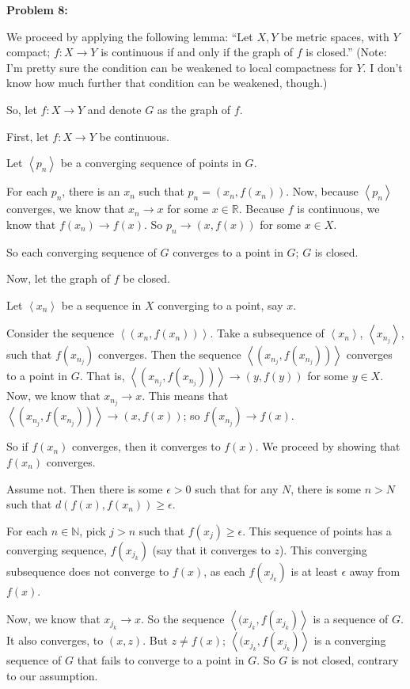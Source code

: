 \documentclass[a4paper,12pt]{article}
\newcommand{\tab}{\hspace{4mm}} %
\newcommand{\anbrack}[1]{\left\langle #1 \right\rangle}
\newcommand{\ep}{\epsilon}
\newcommand{\N}{\mathbb{N}}
\newcommand{\R}{\mathbb{R}}
\begin{document}
{\bf Problem 8:}

We proceed by applying the following lemma: ``Let $X, Y$ be metric spaces, with $Y$ compact; $f: X \to Y$ is continuous if and only if the graph of $f$ is closed.'' (Note: I'm pretty sure the condition can be weakened to local compactness for $Y$. I don't know how much further that condition can be weakened, though.)

So, let $f: X \to Y$ and denote $G$ as the graph of $f$.

First, let $f: X \to Y$ be continuous.

\tab Let $\anbrack{p_n}$ be a converging sequence of points in $G$.

\tab For each $p_n$, there is an $x_n$ such that $p_n = (x_n, f(x_n))$. Now, because $\anbrack{p_n}$ converges, we know that $x_n \to x$ for some $x \in \R$. Because $f$ is continuous, we know that $f(x_n) \to f(x)$. So $p_n \to (x,f(x))$ for some $x \in X$.

\tab So each converging sequence of $G$ converges to a point in $G$; $G$ is closed.

Now, let the graph of $f$ be closed.

\tab Let $\anbrack{x_n}$ be a sequence in $X$ converging to a point, say $x$.

\tab Consider the sequence $\anbrack{(x_n,f(x_n))}$. Take a subsequence of $\anbrack{x_n}$, $\anbrack{x_{n_j}}$, such that $f(x_{n_j})$ converges. Then the sequence $\anbrack{(x_{n_j},f(x_{n_j}))}$ converges to a point in $G$. That is, $\anbrack{(x_{n_j},f(x_{n_j}))} \to (y, f(y))$ for some $y \in X$. Now, we know that $x_{n_j} \to x$. This means that $\anbrack{(x_{n_j},f(x_{n_j}))} \to (x, f(x))$; so $f(x_{n_j}) \to f(x)$.

\tab So if $f(x_n)$ converges, then it converges to $f(x)$. We proceed by showing that $f(x_n)$ converges.

\tab \tab Assume not. Then there is some $\ep >0$ such that for any $N$, there is some $n >N$ such that $d(f(x),f(x_n)) \geq \ep$.

\tab \tab For each $n \in \N$, pick $j >n$ such that $f(x_j) \geq \ep$. This sequence of points has a converging sequence, $f(x_{j_k})$ (say that it converges to $z$). This converging subsequence does not converge to $f(x)$, as each $f(x_{j_k})$ is at least $\ep$ away from $f(x)$.

\tab \tab Now, we know that $x_{j_k} \to x$. So the sequence $\anbrack{(x_{j_k},f(x_{j_k})}$ is a sequence of $G$. It also converges, to $(x,z)$. But $z \neq f(x)$; $\anbrack{(x_{j_k},f(x_{j_k})}$ is a converging sequence of $G$ that fails to converge to a point in $G$. So $G$ is not closed, contrary to our assumption.
\end{document}
